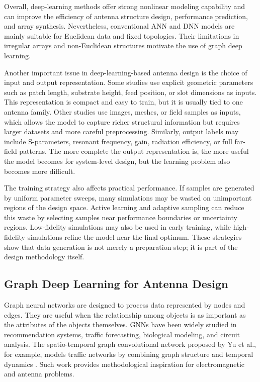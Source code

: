 \documentclass{article}
\begin{document}
Overall, deep-learning methods offer strong nonlinear modeling capability and can improve the efficiency of antenna structure design, performance prediction, and array synthesis. Nevertheless, conventional ANN and DNN models are mainly suitable for Euclidean data and fixed topologies. Their limitations in irregular arrays and non-Euclidean structures motivate the use of graph deep learning.

Another important issue in deep-learning-based antenna design is the choice of input and output representation. Some studies use explicit geometric parameters such as patch length, substrate height, feed position, or slot dimensions as inputs. This representation is compact and easy to train, but it is usually tied to one antenna family. Other studies use images, meshes, or field samples as inputs, which allows the model to capture richer structural information but requires larger datasets and more careful preprocessing. Similarly, output labels may include S-parameters, resonant frequency, gain, radiation efficiency, or full far-field patterns. The more complete the output representation is, the more useful the model becomes for system-level design, but the learning problem also becomes more difficult.

The training strategy also affects practical performance. If samples are generated by uniform parameter sweeps, many simulations may be wasted on unimportant regions of the design space. Active learning and adaptive sampling can reduce this waste by selecting samples near performance boundaries or uncertainty regions. Low-fidelity simulations may also be used in early training, while high-fidelity simulations refine the model near the final optimum. These strategies show that data generation is not merely a preparation step; it is part of the design methodology itself.

\subsection{Graph Deep Learning for Antenna Design}

Graph neural networks are designed to process data represented by nodes and edges. They are useful when the relationship among objects is as important as the attributes of the objects themselves. GNNs have been widely studied in recommendation systems, traffic forecasting, biological modeling, and circuit analysis. The spatio-temporal graph convolutional network proposed by Yu et al., for example, models traffic networks by combining graph structure and temporal dynamics \cite{yu2018stgcn}. Such work provides methodological inspiration for electromagnetic and antenna problems.
\end{document}

